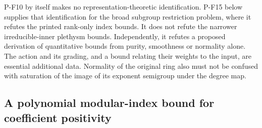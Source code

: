 \documentclass[11pt,a4paper]{article}
\begin{document}
P-F10 by itself makes no representation-theoretic identification.
P-F15 below supplies that identification for the broad subgroup
restriction problem, where it refutes the printed rank-only index bounds.
It does not refute the narrower irreducible-inner plethysm bounds.
Independently, it refutes a proposed derivation of quantitative bounds
from purity, smoothness or normality alone. The action and its
grading, and a bound relating their weights to the input, are essential
additional data. Normality of the original ring also must not be
confused with saturation of the image of its exponent semigroup under
the degree map.


\subsection{A polynomial modular-index bound for coefficient positivity}
\end{document}
